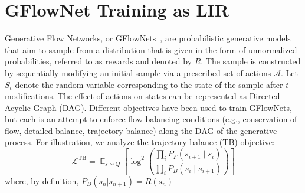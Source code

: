 \documentclass{article} %
\theoremstyle{plain}
\theoremstyle{definition}
\theoremstyle{remark}
\let\cite\citep
\DeclareMathOperator*{\Ex}{\mathbb{E}} %
\newcommand{\mehran}[1]{\todo[backgroundcolor=blue!20]{\textbf{Mehran:} #1}}
\newcommand{\oliver}[1]{\todo[backgroundcolor=green!20]{\textbf{Oliver:} #1}}
\begin{document}

\section{GFlowNet Training as LIR}


Generative Flow Networks, or GFlowNets~\cite{gflownet}, are probabilistic generative models that aim to sample from a distribution that is given in the form of unnormalized probabilities, referred to as rewards and denoted by $R$. The sample is constructed by sequentially modifying an initial sample via a prescribed set of actions $\mathcal{A}$. Let $S_t$ denote the random variable corresponding to the state of the sample after $t$ modifications. The effect of actions on states can be represented as Directed Acyclic Graph (DAG). 
Different objectives have been used to train GFlowNets, but each is an attempt to enforce flow-balancing conditions (e.g., conservation of flow, detailed balance, trajectory balance) along the DAG of the generative process. For illustration, we analyze the trajectory balance (TB) objective:
\[
\mathcal{L}^\mathrm{TB} = \Ex_{s \sim Q}\left[ \log^2\left( \frac{\prod_i P_F(s_{i+1} \mid s_i)}{\prod_i P_B(s_i \mid s_{i+1})} \right) \right]
\]
where, by definition, $P_B(s_n | s_{n+1}) = R(s_n)$
\end{document}
